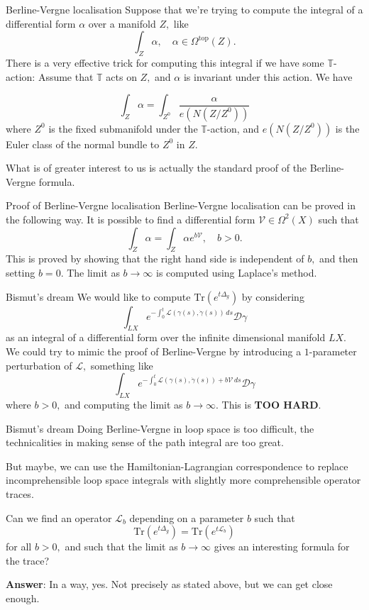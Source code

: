 \documentclass{beamer}
\numberwithin{equation}{section}
\theoremstyle{plain}
\theoremstyle{plain}
\theoremstyle{definition}
\theoremstyle{plain}
\theoremstyle{plain}
\theoremstyle{definition}
\newcommand{\Circ}{\mathbb{T}}
\newcommand{\Dc}{\mathcal{D}}
\newcommand{\Lc}{\mathcal{L}}
\newcommand{\Vc}{\mathcal{V}}
\newcommand{\Tr}{\mathrm{Tr}}
\begin{document}
\begin{frame}{Berline-Vergne localisation}
  Suppose that we're trying to compute the integral of a differential form $\alpha$ over a manifold $Z,$ like
  \[
    \int_Z \alpha,\quad \alpha\in \Omega^{\mathrm{top}}(Z).
  \]
  There is a very effective trick for computing this integral if we have some $\Circ$-action: Assume that $\Circ$ acts
  on $Z,$ and $\alpha$ is invariant under this action. We have
  \begin{theorem}
    \[
      \int_Z \alpha = \int_{Z^{0}} \frac{\alpha}{e(N(Z/Z^0))}
    \]
    where $Z^0$ is the fixed submanifold under the $\Circ$-action, and $e(N(Z/Z^0))$ is the Euler class of the normal bundle to $Z^0$ in $Z.$    
  \end{theorem}
  What is of greater interest to us is actually the standard proof of the Berline-Vergne formula.
\end{frame}

\begin{frame}{Proof of Berline-Vergne localisation}
    Berline-Vergne localisation can be proved in the following way. It is possible to find a differential form $\Vc \in \Omega^2(X)$ such that
    \[
      \int_Z \alpha = \int_Z \alpha e^{b\Vc},\quad b>0.
    \]
    This is proved by showing that the right hand side is independent of $b,$ and then setting $b=0.$ The limit as $b\to\infty$
    is computed using Laplace's method.
    
\end{frame}

\begin{frame}{Bismut's dream}
  We would like to compute $\Tr(e^{t\Delta_g})$ by considering
  \[
    \int_{LX} e^{-\int_0^t \Lc(\gamma(s),\dot{\gamma}(s))\,ds} \Dc\gamma
  \]
  as an integral of a differential form over the infinite dimensional manifold $LX.$
  \pause
  We could try to mimic the proof of Berline-Vergne by introducing a $1$-parameter perturbation of $\Lc,$ something like
  \[
      \int_{LX} e^{-\int_0^t \Lc(\gamma(s),\dot{\gamma}(s))+b\Vc\,ds} \Dc\gamma
  \]
  where $b>0,$ and computing the limit as $b\to\infty.$
  \pause
  This is \textbf{TOO HARD}.
\end{frame}

\begin{frame}{Bismut's dream}
  Doing Berline-Vergne in loop space is too difficult, the technicalities in making sense of the path integral are too great. 
  
  But maybe, we can use the Hamiltonian-Lagrangian correspondence to replace incomprehensible loop space integrals with slightly more comprehensible operator traces.
  \begin{center}
    Can we find an operator $\Lc_b$ depending on a parameter $b$ such that
    \[
      \Tr(e^{t\Delta_g}) = \Tr(e^{t\Lc_b})
    \]
    for all $b>0,$ and such that the limit as $b\to\infty$ gives an interesting formula for the trace?
  \end{center}
  \textbf{Answer}: In a way, yes. Not precisely as stated above, but we can get close enough.
\end{frame}
\end{document}
